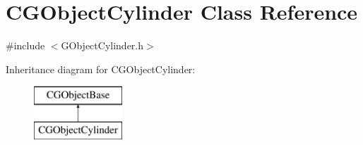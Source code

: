 \hypertarget{class_c_g_object_cylinder}{}\section{C\+G\+Object\+Cylinder Class Reference}
\label{class_c_g_object_cylinder}


{\ttfamily \#include $<$G\+Object\+Cylinder.\+h$>$}

Inheritance diagram for C\+G\+Object\+Cylinder\+:\begin{figure}[H]
\begin{center}
\leavevmode
\includegraphics[height=2.000000cm]{class_c_g_object_cylinder}
\end{center}
\end{figure}
